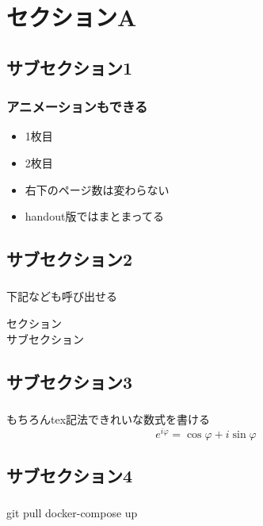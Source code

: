 \section{セクションA}

\subsection{サブセクション1}
\begin{frame}{}
  \frametitle{アニメーションもできる}
  \begin{itemize}
    \item 1枚目
    \item 2枚目
    \item 右下のページ数は変わらない
    \item handout版ではまとまってる
  \end{itemize}
\end{frame}

\subsection{サブセクション2}
\begin{frame}{}
  \frametitle{\insertsubsection}
  下記なども呼び出せる
  \begin{description}
    \item [セクション] \insertsection
    \item [サブセクション] \insertsubsection
  \end{description}
\end{frame}

\subsection{サブセクション3}
\begin{frame}{}
  \frametitle{\insertsubsection}
  もちろんtex記法できれいな数式を書ける
  $$\displaystyle e^{i\varphi} = \cos{\varphi} + i\sin{\varphi} $$
\end{frame}

\subsection{サブセクション4}
\begin{frame}{}
  \frametitle{\insertsubsection}
  git pull
  docker-compose up
\end{frame}
